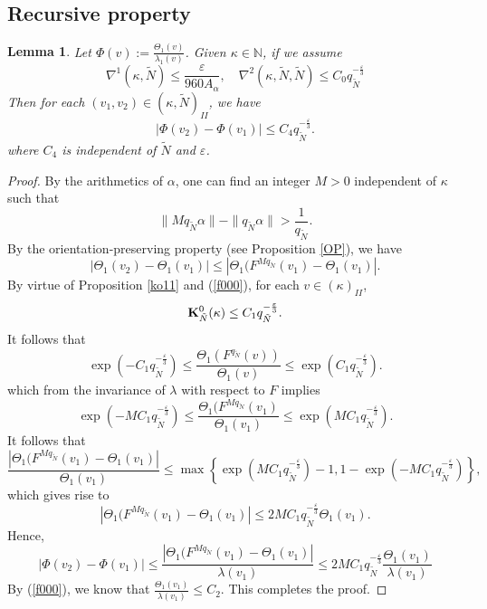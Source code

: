 \documentclass{amsart}
\newtheorem{Lemma}[Definition]{Lemma}
\theoremstyle{definition}
\begin{document}
\subsection{Recursive property}
\begin{Lemma}\label{GG}
Let $\Phi(v):=\frac{\Theta_1(v)}{\lambda_1(v)}$. {Given $\kappa \in \mathbb{N}$, if we assume \[
	\nabla^1(\kappa,\tilde{N})\leq \frac{\varepsilon}{960A_\alpha},\quad\nabla^2(\kappa,\tilde{N},\tilde{N})\leq C_0 q_{\tilde{N}}^{-\frac{\varepsilon}{3}}	\]
	Then for each $(v_1,v_2)\in (\kappa,\tilde{N})_{II}$, we have
	\[|\Phi(v_2)-\Phi(v_1)|\leq C_4 q_{\tilde{N}}^{-\frac{\varepsilon}{3}}.\]
	where $C_4$ is independent of $\tilde{N}$ and $\varepsilon$.}
\end{Lemma}
\begin{proof}
By the arithmetics of $\alpha$, one can find an integer $M>0$ independent of $\kappa$ such that
\[\|Mq_{\tilde{N}}\alpha\|-\|q_{\tilde{N}}\alpha\|>\frac{1}{q_{\tilde{N}}}.\]
By the orientation-preserving property (see Proposition \ref{OP}), we have
\[|\Theta_1(v_2)-\Theta_1(v_1)|\leq |\Theta_1(F^{Mq_{\tilde{N}}}(v_1)-\Theta_1(v_1)|.\]
By virtue of Proposition \ref{ko11} and {(\ref{f000})}, for each $v\in (\kappa)_{II}$,
{\[\bold{K}_{\tilde{N}}^0(\kappa)\leq C_1 q_{\tilde{N}}^{-\frac{\varepsilon}{3}}.\]
	It follows that
	\[\exp\left(-C_1q_{\tilde{N}}^{-\frac{\varepsilon}{3}}\right)\leq \frac{\Theta_1(F^{q_{\tilde{N}}}(v))}{\Theta_1(v)}\leq \exp\left(C_1q_{\tilde{N}}^{-\frac{\varepsilon}{3}}\right).\]
	which from the invariance of $\lambda$ with respect to $F$ implies
	\[\exp\left(-MC_1q_{\tilde{N}}^{-\frac{\varepsilon}{3}}\right)\leq \frac{\Theta_1(F^{Mq_{\tilde{N}}}(v_1)}{\Theta_1(v_1)}\leq \exp\left(MC_1q_{\tilde{N}}^{-\frac{\varepsilon}{3}}\right).\]
	It follows that
	\[\frac{|\Theta_1(F^{Mq_{\tilde{N}}}(v_1)-\Theta_1(v_1)|}{\Theta_1(v_1)}\leq \max\left\{\exp\left(MC_1q_{\tilde{N}}^{-\frac{\varepsilon}{3}}\right)-1,1-\exp\left(-MC_1q_{\tilde{N}}^{-\frac{\varepsilon}{3}}\right)\right\},\]
	which gives rise to
	\[|\Theta_1(F^{Mq_{\tilde{N}}}(v_1)-\Theta_1(v_1)|\leq
	2MC_1 q_{\tilde{N}}^{-\frac{\varepsilon}{3}}\Theta_1(v_1).\]
	Hence,
	\[|\Phi(v_2)-\Phi(v_1)|\leq \frac{|\Theta_1(F^{Mq_{\tilde{N}}}(v_1)-\Theta_1(v_1)|}{\lambda(v_1)}\leq 2MC_1 q_{\tilde{N}}^{-\frac{\varepsilon}{3}}\frac{\Theta_1(v_1)}{\lambda(v_1)}\]
	By {(\ref{f000})}, we know that $\frac{\Theta_1(v_1)}{\lambda(v_1)}\leq C_2$. This completes the proof.}
\end{proof}
\end{document}
